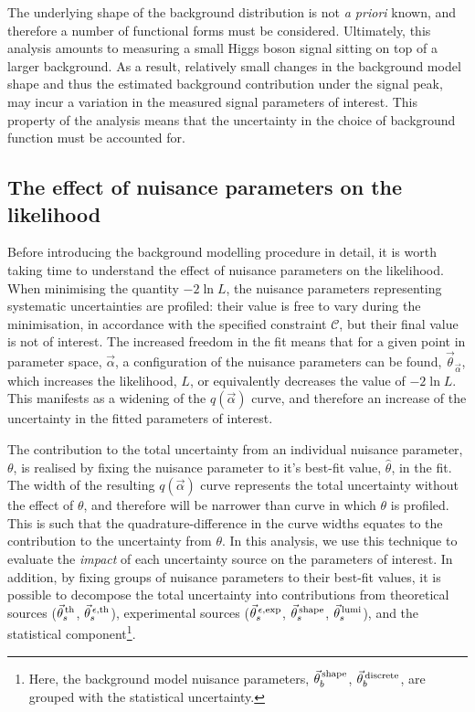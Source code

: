 The underlying shape of the background distribution is not \textit{a priori} known, and therefore a number of functional forms must be considered. Ultimately, this analysis amounts to measuring a small Higgs boson signal sitting on top of a larger background. As a result, relatively small changes in the background model shape and thus the estimated background contribution under the signal peak, may incur a variation in the measured signal parameters of interest. This property of the analysis means that the uncertainty in the choice of background function must be accounted for.

\subsection{The effect of nuisance parameters on the likelihood}\label{sec:effect_of_nuisance}
Before introducing the background modelling procedure in detail, it is worth taking time to understand the effect of nuisance parameters on the likelihood. When minimising the quantity $-2\ln{L}$, the nuisance parameters representing systematic uncertainties are profiled: their value is free to vary during the minimisation, in accordance with the specified constraint $\mathcal{C}$, but their final value is not of interest. The increased freedom in the fit means that for a given point in parameter space, $\vec{\alpha}$, a configuration of the nuisance parameters can be found, $\vec{\theta}_{\vec{\alpha}}$, which increases the likelihood, $L$, or equivalently decreases the value of $-2\ln{L}$. This manifests as a widening of the $q(\vec{\alpha})$ curve, and therefore an increase of the uncertainty in the fitted parameters of interest.

The contribution to the total uncertainty from an individual nuisance parameter, $\theta$, is realised by fixing the nuisance parameter to it's best-fit value, $\hat{\theta}$, in the fit. The width of the resulting $q(\vec{\alpha})$ curve represents the total uncertainty without the effect of $\theta$, and therefore will be narrower than curve in which $\theta$ is profiled. This is such that the quadrature-difference in the curve widths equates to the contribution to the uncertainty from $\theta$. In this analysis, we use this technique to evaluate the \textit{impact} of each uncertainty source on the parameters of interest. In addition, by fixing groups of nuisance parameters to their best-fit values, it is possible to decompose the total uncertainty into contributions from theoretical sources ($\vec{\theta}^{\,\rm{th}}_{s}$, $\vec{\theta}^{\,\epsilon,{\rm{th}}}_{s}$), experimental sources ($\vec{\theta}^{\,\epsilon,{\rm{exp}}}_{s}$, $\vec{\theta}^{\,\rm{shape}}_{s}$, $\vec{\theta}^{\,\rm{lumi}}_{s}$), and the statistical component\footnote{Here, the background model nuisance parameters, $\vec{\theta}^{\,\rm{shape}}_{b}$, $\vec{\theta}^{\,\rm{discrete}}_{b}$, are grouped with the statistical uncertainty.}. 

